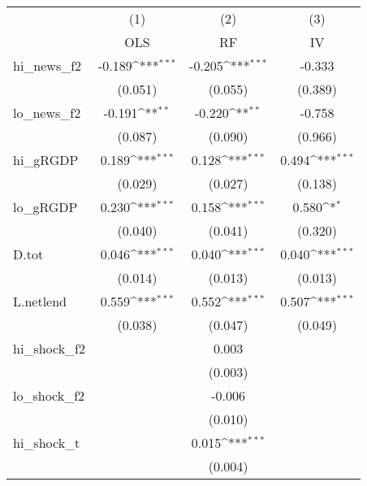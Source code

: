 {
\def\sym#1{\ifmmode^{#1}\else\(^{#1}\)\fi}
\begin{tabular}{l*{3}{c}}
\toprule
            &\multicolumn{1}{c}{(1)}&\multicolumn{1}{c}{(2)}&\multicolumn{1}{c}{(3)}\\
            &\multicolumn{1}{c}{OLS}&\multicolumn{1}{c}{RF}&\multicolumn{1}{c}{IV}\\
\midrule
hi\_news\_f2  &      -0.189\sym{***}&      -0.205\sym{***}&      -0.333         \\
            &     (0.051)         &     (0.055)         &     (0.389)         \\
\addlinespace
lo\_news\_f2  &      -0.191\sym{**} &      -0.220\sym{**} &      -0.758         \\
            &     (0.087)         &     (0.090)         &     (0.966)         \\
\addlinespace
hi\_gRGDP    &       0.189\sym{***}&       0.128\sym{***}&       0.494\sym{***}\\
            &     (0.029)         &     (0.027)         &     (0.138)         \\
\addlinespace
lo\_gRGDP    &       0.230\sym{***}&       0.158\sym{***}&       0.580\sym{*}  \\
            &     (0.040)         &     (0.041)         &     (0.320)         \\
\addlinespace
D.tot       &       0.046\sym{***}&       0.040\sym{***}&       0.040\sym{***}\\
            &     (0.014)         &     (0.013)         &     (0.013)         \\
\addlinespace
L.netlend   &       0.559\sym{***}&       0.552\sym{***}&       0.507\sym{***}\\
            &     (0.038)         &     (0.047)         &     (0.049)         \\
\addlinespace
hi\_shock\_f2 &                     &       0.003         &                     \\
            &                     &     (0.003)         &                     \\
\addlinespace
lo\_shock\_f2 &                     &      -0.006         &                     \\
            &                     &     (0.010)         &                     \\
\addlinespace
hi\_shock\_t  &                     &       0.015\sym{***}&                     \\
            &                     &     (0.004)         &                     \\

\end{tabular}}
